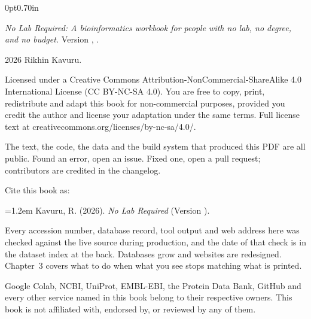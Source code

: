 \thispagestyle{empty}
\null\vfill
%
\begin{adjustwidth}{0pt}{0.70in}
{\fontsize{8}{11.5}\selectfont

\textit{No Lab Required: A bioinformatics workbook for people with no lab,
no degree, and no budget.} Version \nlrversion, \nlrreleasedate.

\vspace{13pt}
\textcopyright{} 2026 Rikhin Kavuru.

\vspace{6pt}
Licensed under a Creative Commons Attribution-NonCommercial-ShareAlike 4.0
International License (CC BY-NC-SA 4.0). You are free to copy, print,
redistribute and adapt this book for non-commercial purposes, provided you
credit the author and license your adaptation under the same terms. Full
license text at creativecommons.org/licenses/by-nc-sa/4.0/.

\vspace{6pt}
The text, the code, the data and the build system that produced this PDF are
all public. Found an error, open an issue. Fixed one, open a pull request;
contributors are credited in the changelog.

\vspace{13pt}
Cite this book as:

\vspace{2pt}
{\hangindent=1.2em
Kavuru, R. (2026). \textit{No Lab Required} (Version \nlrversion). \nlrrepo\par}

\vspace{13pt}
Every accession number, database record, tool output and web address here was
checked against the live source during production, and the date of that check
is in the dataset index at the back. Databases grow and websites are
redesigned. Chapter~3 covers what to do when what you see stops matching what
is printed.

\vspace{6pt}
Google Colab, NCBI, UniProt, EMBL-EBI, the Protein Data Bank, GitHub and every
other service named in this book belong to their respective owners. This book
is not affiliated with, endorsed by, or reviewed by any of them.

}
\end{adjustwidth}
\clearpage

